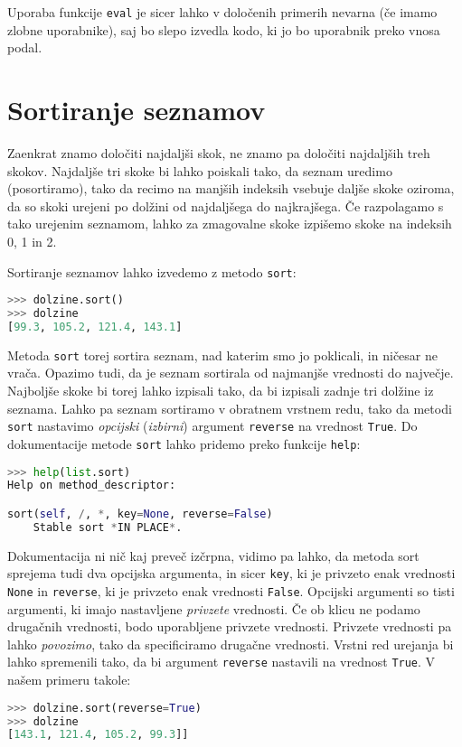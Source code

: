 Uporaba funkcije \texttt{eval} je sicer lahko v določenih primerih nevarna (če imamo zlobne uporabnike), saj bo slepo izvedla kodo, ki jo bo uporabnik preko vnosa podal.

\section{Sortiranje seznamov}

Zaenkrat znamo določiti najdaljši skok, ne znamo pa določiti najdaljših treh skokov. Najdaljše tri skoke bi lahko poiskali tako, da seznam uredimo (posortiramo), tako da recimo na manjših indeksih vsebuje daljše skoke oziroma, da so skoki urejeni po dolžini od najdaljšega do najkrajšega. Če razpolagamo s tako urejenim seznamom, lahko za zmagovalne skoke izpišemo skoke na indeksih 0, 1 in 2. 

Sortiranje seznamov lahko izvedemo z metodo \texttt{sort}:
\begin{lstlisting}[language=Python]
>>> dolzine.sort()
>>> dolzine
[99.3, 105.2, 121.4, 143.1]
\end{lstlisting}
Metoda \texttt{sort} torej sortira seznam, nad katerim smo jo poklicali, in ničesar ne vrača. Opazimo tudi, da je seznam sortirala od najmanjše vrednosti do največje. Najboljše skoke bi torej lahko izpisali tako, da bi izpisali zadnje tri dolžine iz seznama. Lahko pa seznam sortiramo v obratnem vrstnem redu, tako da metodi \texttt{sort} nastavimo \emph{opcijski} (\emph{izbirni}) argument \texttt{reverse} na vrednost \texttt{True}.
Do dokumentacije metode \texttt{sort} lahko pridemo preko funkcije \texttt{help}:
\begin{lstlisting}[language=Python]
>>> help(list.sort)
Help on method_descriptor:

sort(self, /, *, key=None, reverse=False)
    Stable sort *IN PLACE*.
\end{lstlisting}
Dokumentacija ni nič kaj preveč izčrpna, vidimo pa lahko, da metoda sort sprejema tudi dva opcijska argumenta, in sicer \texttt{key}, ki je privzeto enak vrednosti \texttt{None} in \texttt{reverse}, ki je privzeto enak vrednosti \texttt{False}. Opcijski argumenti so tisti argumenti, ki imajo nastavljene \emph{privzete}  vrednosti. Če ob klicu ne podamo drugačnih vrednosti, bodo uporabljene privzete vrednosti. Privzete vrednosti pa lahko \emph{povozimo}, tako da specificiramo drugačne vrednosti. Vrstni red urejanja bi lahko spremenili tako, da bi argument \texttt{reverse} nastavili na vrednost \texttt{True}. V našem primeru takole:
\begin{lstlisting}[language=Python]
>>> dolzine.sort(reverse=True)
>>> dolzine
[143.1, 121.4, 105.2, 99.3]]
\end{lstlisting}

